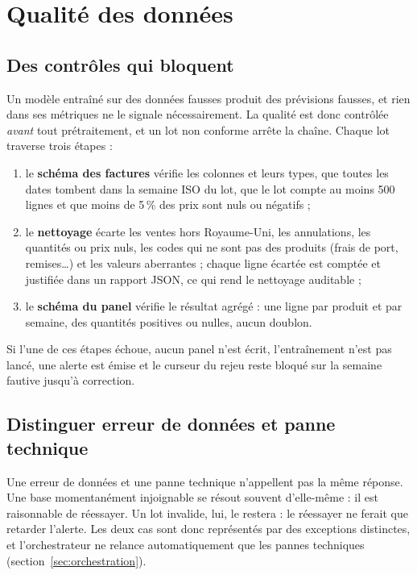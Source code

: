 \documentclass[11pt,a4paper]{article}
\begin{document}
\section{Qualité des données}\label{sec:qualite}

\subsection{Des contrôles qui bloquent}

Un modèle entraîné sur des données fausses produit des prévisions fausses, et rien dans ses
métriques ne le signale nécessairement. La qualité est donc contrôlée \emph{avant} tout
prétraitement, et un lot non conforme arrête la chaîne. Chaque lot traverse trois étapes :

\begin{enumerate}
  \item le \textbf{schéma des factures} vérifie les colonnes et leurs types, que toutes les
        dates tombent dans la semaine ISO du lot, que le lot compte au moins 500 lignes et
        que moins de 5\,\% des prix sont nuls ou négatifs ;
  \item le \textbf{nettoyage} écarte les ventes hors Royaume-Uni, les annulations, les
        quantités ou prix nuls, les codes qui ne sont pas des produits (frais de port,
        remises\ldots) et les valeurs aberrantes ; chaque ligne écartée est comptée et
        justifiée dans un rapport JSON, ce qui rend le nettoyage auditable ;
  \item le \textbf{schéma du panel} vérifie le résultat agrégé : une ligne par produit et par
        semaine, des quantités positives ou nulles, aucun doublon.
\end{enumerate}

Si l'une de ces étapes échoue, aucun panel n'est écrit, l'entraînement n'est pas lancé, une
alerte est émise et le curseur du rejeu reste bloqué sur la semaine fautive jusqu'à
correction.

\subsection{Distinguer erreur de données et panne technique}

Une erreur de données et une panne technique n'appellent pas la même réponse. Une base
momentanément injoignable se résout souvent d'elle-même : il est raisonnable de réessayer.
Un lot invalide, lui, le restera : le réessayer ne ferait que retarder l'alerte. Les deux
cas sont donc représentés par des exceptions distinctes, et l'orchestrateur ne relance
automatiquement que les pannes techniques (section~\ref{sec:orchestration}).
\end{document}
